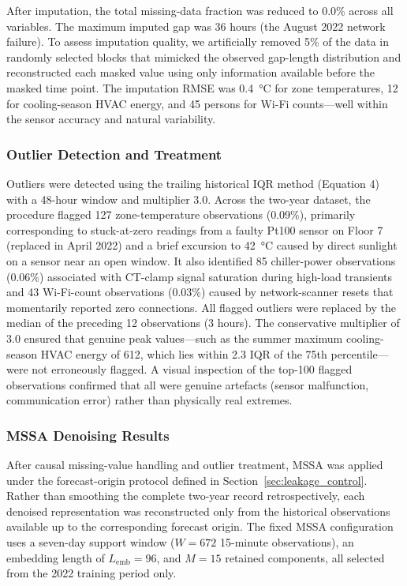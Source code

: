 \documentclass[11pt]{article}
\begin{document}
After imputation, the total missing-data fraction was reduced to 0.0\% across all variables. The maximum imputed gap was 36 hours (the August 2022 network failure). To assess imputation quality, we artificially removed 5\% of the data in randomly selected blocks that mimicked the observed gap-length distribution and reconstructed each masked value using only information available before the masked time point. The imputation RMSE was \SI{0.4}{\celsius} for zone temperatures, \SI{12}{\kwh} for cooling-season HVAC energy, and 45 persons for Wi-Fi counts---well within the sensor accuracy and natural variability.

\subsubsection{Outlier Detection and Treatment}

Outliers were detected using the trailing historical IQR method (Equation 4) with a 48-hour window and multiplier 3.0. Across the two-year dataset, the procedure flagged 127 zone-temperature observations (0.09\%), primarily corresponding to stuck-at-zero readings from a faulty Pt100 sensor on Floor 7 (replaced in April 2022) and a brief excursion to \SI{42}{\celsius} caused by direct sunlight on a sensor near an open window. It also identified 85 chiller-power observations (0.06\%) associated with CT-clamp signal saturation during high-load transients and 43 Wi-Fi-count observations (0.03\%) caused by network-scanner resets that momentarily reported zero connections. All flagged outliers were replaced by the median of the preceding 12 observations (3 hours). The conservative multiplier of 3.0 ensured that genuine peak values—such as the summer maximum cooling-season HVAC energy of \SI{612}{\kwh}, which lies within 2.3 IQR of the 75th percentile—were not erroneously flagged. A visual inspection of the top-100 flagged observations confirmed that all were genuine artefacts (sensor malfunction, communication error) rather than physically real extremes.

\subsubsection{MSSA Denoising Results}

After causal missing-value handling and outlier treatment, MSSA was applied under the forecast-origin protocol defined in Section~\ref{sec:leakage_control}. Rather than smoothing the complete two-year record retrospectively, each denoised representation was reconstructed only from the historical observations available up to the corresponding forecast origin. The fixed MSSA configuration uses a seven-day support window ($W=672$ 15-minute observations), an embedding length of $L_{\mathrm{emb}}=96$, and $M=15$ retained components, all selected from the 2022 training period only.
\end{document}
